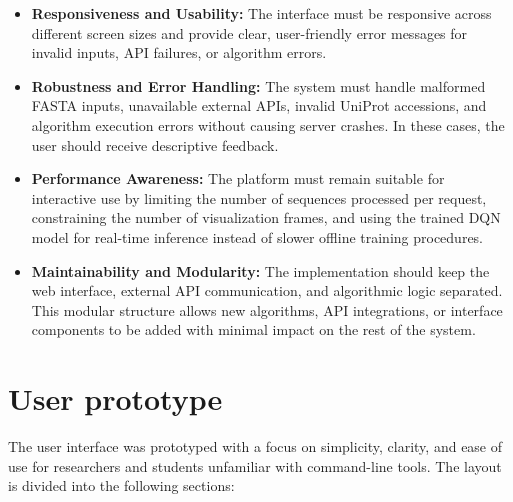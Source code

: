 \begin{itemize}
    \item \textbf{Responsiveness and Usability:} The interface must be responsive across different screen sizes and provide clear, user-friendly error messages for invalid inputs, API failures, or algorithm errors.

    \item \textbf{Robustness and Error Handling:} The system must handle malformed FASTA inputs, unavailable external APIs, invalid UniProt accessions, and algorithm execution errors without causing server crashes. In these cases, the user should receive descriptive feedback.

    \item \textbf{Performance Awareness:} The platform must remain suitable for interactive use by limiting the number of sequences processed per request, constraining the number of visualization frames, and using the trained DQN model for real-time inference instead of slower offline training procedures.

    \item \textbf{Maintainability and Modularity:} The implementation should keep the web interface, external API communication, and algorithmic logic separated. This modular structure allows new algorithms, API integrations, or interface components to be added with minimal impact on the rest of the system.
\end{itemize}

\section{User prototype}
\label{cap3:sec_prototype}

The user interface was prototyped with a focus on simplicity, clarity, and ease of use for researchers and students unfamiliar with command-line tools. The layout is divided into the following sections:

